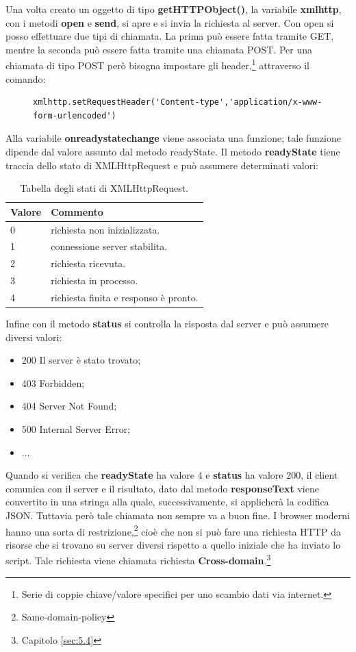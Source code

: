 \documentclass[a4paper,11pt]{article}
\begin{document}
Una volta creato un oggetto di tipo \textbf{getHTTPObject()}, la variabile \textbf{xmlhttp}, con i metodi \textbf{open} e \textbf{send}, si apre e si invia la richiesta al server.\newline
Con open si posso effettuare due tipi di chiamata. La prima può essere fatta tramite GET, mentre la seconda può essere fatta tramite una chiamata POST. Per una chiamata di tipo POST però bisogna impostare gli header,\footnote{Serie di coppie chiave/valore specifici per uno scambio dati via internet.} attraverso il comando:
\begin{figure}[htb]
\begin{lstlisting}[style=htmlcssjs]
xmlhttp.setRequestHeader('Content-type','application/x-www-form-urlencoded')
\end{lstlisting}
\end{figure}\newline
Alla variabile \textbf{onreadystatechange} viene associata una funzione; tale funzione dipende dal valore assunto dal metodo readyState.
Il metodo \textbf{readyState} tiene traccia dello stato di XMLHttpRequest e può assumere determinati valori:
\begin{table}[htb]
\begin{center}				
\begin{tabular}{|>{\small}l|>{\small}l|}
	\hline	\textbf{Valore} & \textbf{Commento}\\				
	\hline	0 & richiesta non inizializzata.\\
	\hline	1 & connessione server stabilita.\\
	\hline	2 & richiesta ricevuta.\\
	\hline	3 & richiesta in processo.\\
	\hline	4 & richiesta finita e responso è pronto.\\
	\hline			
\end{tabular}	
\caption{Tabella degli stati di XMLHttpRequest.}	
\end{center}	
\end{table}\newline
Infine con il metodo \textbf{status} si controlla la risposta dal server e può  assumere diversi valori:
\begin{itemize}
	\item 200 Il server è stato trovato;
	\item 403 Forbidden;
	\item 404 Server Not Found;
	\item 500 Internal Server Error;
	\item ...
\end{itemize}
Quando si verifica che \textbf{readyState} ha valore 4 e \textbf{status} ha valore 200, il client comunica con il server e il risultato, dato dal metodo \textbf{responseText} viene convertito in una stringa alla quale, successivamente, si applicherà la codifica JSON.
Tuttavia però tale chiamata non sempre va a buon fine. I browser moderni hanno una sorta di restrizione,\footnote{Same-domain-policy} cioè che non si può fare una richiesta HTTP da risorse che si trovano su server diversi rispetto a quello iniziale che ha inviato lo script.\newline
Tale richiesta viene chiamata richiesta \textbf{Cross-domain}.\footnote{Capitolo \ref{sec:5.4}}
\end{document}
